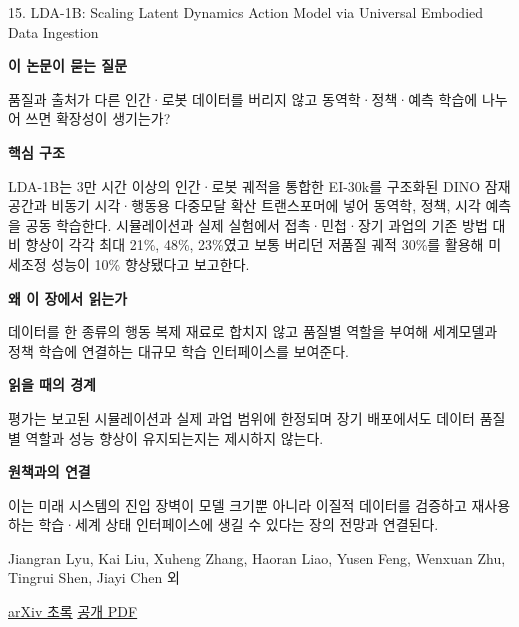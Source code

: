 \documentclass[11pt,openany]{book}
\begin{document}
\begin{termcard}{15. LDA-1B: Scaling Latent Dynamics Action Model via Universal Embodied Data Ingestion}

\par

\medskip

{\sffamily\bfseries\color{deepblue} 이 논문이 묻는 질문}\par

품질과 출처가 다른 인간·로봇 데이터를 버리지 않고 동역학·정책·예측 학습에 나누어 쓰면 확장성이 생기는가?

\smallskip

{\sffamily\bfseries\color{deepblue} 핵심 구조}\par

LDA-1B는 3만 시간 이상의 인간·로봇 궤적을 통합한 EI-30k를 구조화된 DINO 잠재 공간과 비동기 시각·행동용 다중모달 확산 트랜스포머에 넣어 동역학, 정책, 시각 예측을 공동 학습한다. 시뮬레이션과 실제 실험에서 접촉·민첩·장기 과업의 기존 방법 대비 향상이 각각 최대 21\%, 48\%, 23\%였고 보통 버리던 저품질 궤적 30\%를 활용해 미세조정 성능이 10\% 향상됐다고 보고한다.

\smallskip

{\sffamily\bfseries\color{deepblue} 왜 이 장에서 읽는가}\par

데이터를 한 종류의 행동 복제 재료로 합치지 않고 품질별 역할을 부여해 세계모델과 정책 학습에 연결하는 대규모 학습 인터페이스를 보여준다.

\smallskip

{\sffamily\bfseries\color{coral} 읽을 때의 경계}\par

평가는 보고된 시뮬레이션과 실제 과업 범위에 한정되며 장기 배포에서도 데이터 품질별 역할과 성능 향상이 유지되는지는 제시하지 않는다.

\smallskip

{\sffamily\bfseries\color{teal} 원책과의 연결}\par

이는 미래 시스템의 진입 장벽이 모델 크기뿐 아니라 이질적 데이터를 검증하고 재사용하는 학습·세계 상태 인터페이스에 생길 수 있다는 장의 전망과 연결된다.

\medskip

{\footnotesize\color{muted} Jiangran Lyu, Kai Liu, Xuheng Zhang, Haoran Liao, Yusen Feng, Wenxuan Zhu, Tingrui Shen, Jiayi Chen 외\par

\href{https://arxiv.org/abs/2602.12215}{arXiv 초록} \quad \href{https://arxiv.org/pdf/2602.12215}{공개 PDF}\par}

\end{termcard}
\end{document}
